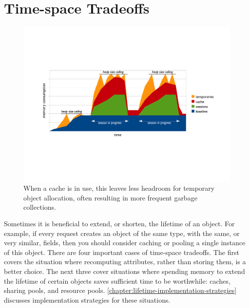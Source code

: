 \section{Time-space Tradeoffs}
\label{sec:time-space-tradeoffs-pattern}

\begin{figure}[h]  %
	\centering
	\includegraphics[width=\textwidth]{part4/Figures/lifetime/timeline-base-session-temps-with-cache}
	\caption{When a cache is in use, this leaves less headroom for temporary
	object allocation, often resulting in more frequent garbage collections.}
	\label{fig:timeline-base-session-temps-with-cache}
\end{figure}

Sometimes it is beneficial to extend, or shorten, the lifetime of an object. For
example, if every request creates an object of the same type, with the same, or
very similar, fields, then you should consider caching or pooling a single
instance of this object. There are four important cases of time-space tradeoffs.
The first covers the situation where recomputing attributes, rather than storing
them, is a better choice. The next three cover situations where spending memory
to extend the lifetime of certain objects saves sufficient time to be worthwhile:
caches, sharing pools, and resource pools.
\autoref{chapter:lifetime-implementation-strategies} discusses implementation
strategies for these situations.

